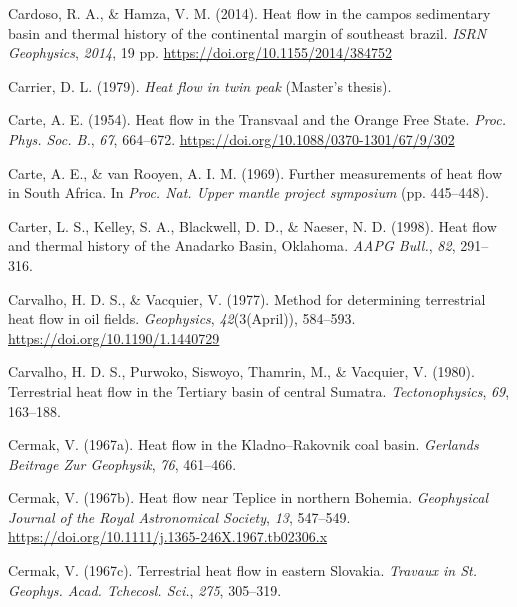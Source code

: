 \begin{CSLReferences}{1}{1}
\leavevmode{}%
Cardoso, R. A., \& Hamza, V. M. (2014). Heat flow in the campos sedimentary basin and thermal history of the continental margin of southeast brazil. \emph{ISRN Geophysics}, \emph{2014}, 19 pp. \url{https://doi.org/10.1155/2014/384752}

\leavevmode{}%
Carrier, D. L. (1979). \emph{Heat flow in twin peak} (Master's thesis).

\leavevmode{}%
Carte, A. E. (1954). Heat flow in the {Transvaal} and the {Orange Free State}. \emph{Proc. Phys. Soc. B.}, \emph{67}, 664--672. \url{https://doi.org/10.1088/0370-1301/67/9/302}

\leavevmode{}%
Carte, A. E., \& van Rooyen, A. I. M. (1969). Further measurements of heat flow in {South Africa}. In \emph{Proc. Nat. Upper mantle project symposium} (pp. 445--448).

\leavevmode{}%
Carter, L. S., Kelley, S. A., Blackwell, D. D., \& Naeser, N. D. (1998). Heat flow and thermal history of the {Anadarko Basin, Oklahoma}. \emph{AAPG Bull.}, \emph{82}, 291--316.

\leavevmode{}%
Carvalho, H. D. S., \& Vacquier, V. (1977). Method for determining terrestrial heat flow in oil fields. \emph{Geophysics}, \emph{42}(3(April)), 584--593. \url{https://doi.org/10.1190/1.1440729}

\leavevmode{}%
Carvalho, H. D. S., Purwoko, Siswoyo, Thamrin, M., \& Vacquier, V. (1980). Terrestrial heat flow in the {Tertiary} basin of central {Sumatra}. \emph{Tectonophysics}, \emph{69}, 163--188.

\leavevmode{}%
Cermak, V. (1967a). Heat flow in the {Kladno--Rakovnik} coal basin. \emph{Gerlands Beitrage Zur Geophysik}, \emph{76}, 461--466.

\leavevmode{}%
Cermak, V. (1967b). Heat flow near {Teplice} in northern {Bohemia}. \emph{Geophysical Journal of the Royal Astronomical Society}, \emph{13}, 547--549. \url{https://doi.org/10.1111/j.1365-246X.1967.tb02306.x}

\leavevmode{}%
Cermak, V. (1967c). Terrestrial heat flow in eastern {Slovakia}. \emph{Travaux in St. Geophys. Acad. Tchecosl. Sci.}, \emph{275}, 305--319.


\end{CSLReferences}
